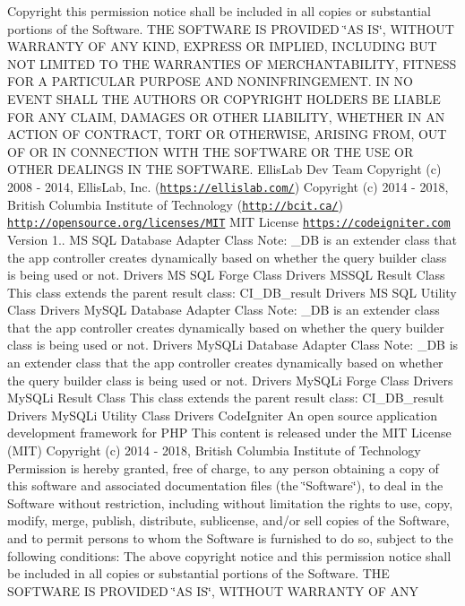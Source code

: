 \begin{DoxyCopyright}{Copyright}
this permission notice shall be included in all copies or substantial portions of the Software. T\+HE S\+O\+F\+T\+W\+A\+RE IS P\+R\+O\+V\+I\+D\+ED \char`\"{}\+A\+S I\+S\char`\"{}, W\+I\+T\+H\+O\+UT W\+A\+R\+R\+A\+N\+TY OF A\+NY K\+I\+ND, E\+X\+P\+R\+E\+SS OR I\+M\+P\+L\+I\+ED, I\+N\+C\+L\+U\+D\+I\+NG B\+UT N\+OT L\+I\+M\+I\+T\+ED TO T\+HE W\+A\+R\+R\+A\+N\+T\+I\+ES OF M\+E\+R\+C\+H\+A\+N\+T\+A\+B\+I\+L\+I\+TY, F\+I\+T\+N\+E\+SS F\+OR A P\+A\+R\+T\+I\+C\+U\+L\+AR P\+U\+R\+P\+O\+SE A\+ND N\+O\+N\+I\+N\+F\+R\+I\+N\+G\+E\+M\+E\+NT. IN NO E\+V\+E\+NT S\+H\+A\+LL T\+HE A\+U\+T\+H\+O\+RS OR C\+O\+P\+Y\+R\+I\+G\+HT H\+O\+L\+D\+E\+RS BE L\+I\+A\+B\+LE F\+OR A\+NY C\+L\+A\+IM, D\+A\+M\+A\+G\+ES OR O\+T\+H\+ER L\+I\+A\+B\+I\+L\+I\+TY, W\+H\+E\+T\+H\+ER IN AN A\+C\+T\+I\+ON OF C\+O\+N\+T\+R\+A\+CT, T\+O\+RT OR O\+T\+H\+E\+R\+W\+I\+SE, A\+R\+I\+S\+I\+NG F\+R\+OM, O\+UT OF OR IN C\+O\+N\+N\+E\+C\+T\+I\+ON W\+I\+TH T\+HE S\+O\+F\+T\+W\+A\+RE OR T\+HE U\+SE OR O\+T\+H\+ER D\+E\+A\+L\+I\+N\+GS IN T\+HE S\+O\+F\+T\+W\+A\+RE.  Ellis\+Lab Dev Team  Copyright (c) 2008 -\/ 2014, Ellis\+Lab, Inc. (\href{https://ellislab.com/}{\tt https\+://ellislab.\+com/})  Copyright (c) 2014 -\/ 2018, British Columbia Institute of Technology (\href{http://bcit.ca/}{\tt http\+://bcit.\+ca/})  \href{http://opensource.org/licenses/MIT}{\tt http\+://opensource.\+org/licenses/\+M\+IT} M\+IT License  \href{https://codeigniter.com}{\tt https\+://codeigniter.\+com}  Version 1..  MS S\+QL Database Adapter Class Note\+: \+\_\+\+DB is an extender class that the app controller creates dynamically based on whether the query builder class is being used or not.  Drivers MS S\+QL Forge Class  Drivers M\+S\+S\+QL Result Class This class extends the parent result class\+: C\+I\+\_\+\+D\+B\+\_\+result  Drivers MS S\+QL Utility Class  Drivers My\+S\+QL Database Adapter Class Note\+: \+\_\+\+DB is an extender class that the app controller creates dynamically based on whether the query builder class is being used or not.  Drivers My\+S\+Q\+Li Database Adapter Class Note\+: \+\_\+\+DB is an extender class that the app controller creates dynamically based on whether the query builder class is being used or not.  Drivers My\+S\+Q\+Li Forge Class  Drivers My\+S\+Q\+Li Result Class This class extends the parent result class\+: C\+I\+\_\+\+D\+B\+\_\+result  Drivers My\+S\+Q\+Li Utility Class  Drivers Code\+Igniter An open source application development framework for P\+HP This content is released under the M\+IT License (M\+IT) Copyright (c) 2014 -\/ 2018, British Columbia Institute of Technology Permission is hereby granted, free of charge, to any person obtaining a copy of this software and associated documentation files (the \char`\"{}\+Software\char`\"{}), to deal in the Software without restriction, including without limitation the rights to use, copy, modify, merge, publish, distribute, sublicense, and/or sell copies of the Software, and to permit persons to whom the Software is furnished to do so, subject to the following conditions\+: The above copyright notice and this permission notice shall be included in all copies or substantial portions of the Software. T\+HE S\+O\+F\+T\+W\+A\+RE IS P\+R\+O\+V\+I\+D\+ED \char`\"{}\+A\+S I\+S\char`\"{}, W\+I\+T\+H\+O\+UT W\+A\+R\+R\+A\+N\+TY OF A\+NY 
\end{DoxyCopyright}
